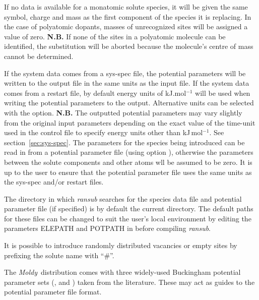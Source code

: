 \documentclass[a4paper,twoside]{report}
\newcommand{\moldy}{\emph{Moldy}}
\begin{document}
If no data is available for a monatomic solute species, it
will be given the same symbol, charge and mass as the first component
of the species it is replacing. In the case of polyatomic dopants,
masses of unrecognized sites will be assigned a value of zero. \textbf{N.B.}
If none of the sites in a polyatomic molecule can be identified, the substitution will
be aborted because the molecule's centre of mass cannot be determined.

If the system data comes from a sys-spec file, the potential
parameters will be written to the output file in the same units as the input file.
If the system data comes from a restart file, by default energy units of kJ.mol$^{-1}$
will be used when writing the potential parameters to the output. Alternative units can be
selected with the  option.
\textbf{N.B.} The outputted potential parameters may vary slightly from the original
input parameters depending on the exact value of the time-unit used
in the control file to specify energy units other than kJ\,mol$^{-1}$. See
section~\ref{sec:sys-spec}. 
The parameters for the species being introduced
can be read in from a potential parameter file (using option ),
otherwise the parameters between the solute components and
other atoms wll be assumed to be zero. It is up to the user to ensure that
the potential parameter file uses the same units as the sys-spec and/or restart
files.

The directory in which \emph{ransub} searches for the species data
file and potential parameter file (if specified) is by default the current
directory. The default paths for these
files can be changed to suit the user's local environment by editing the
parameters ELEPATH and POTPATH in  before compiling
\emph{ransub}.

It is possible to introduce
randomly distributed vacancies or empty sites by prefixing the solute name with ``\#''.

The \moldy\ distribution comes with three widely-used Buckingham potential
parameter sets (,  and
) taken from the literature. These may act as guides
to the potential parameter file format.

\end{document}
